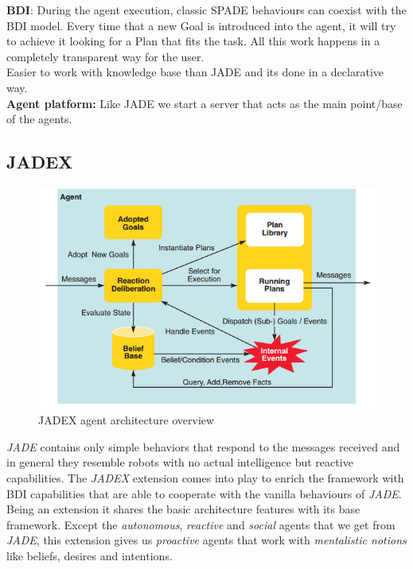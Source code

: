 \documentclass[a4paper, 11pt]{article}
\begin{document}
\noindent \textbf{BDI}: During the agent execution, classic SPADE behaviours can coexist with the BDI model. Every time that a new Goal is introduced into the agent, it will try to achieve it looking for a Plan that fits the task. All this work happens in a completely transparent way for the user. \\
Easier to work with knowledge base than JADE and its done in a declarative way. \\

\noindent \textbf{Agent platform:} Like JADE we start a server that acts as the main point/base of the agents.

\subsection{JADEX}

\begin{figure}[H]
	\caption{JADEX agent architecture overview}
	\centering
	\includegraphics[scale=0.6]{./images/jadex_overview.png}
\end{figure}

\textit{JADE} contains only simple behaviors that respond to the messages received and in general they resemble robots with no actual intelligence but reactive capabilities. The \textit{JADEX} extension comes into play to enrich the framework with BDI capabilities that are able to cooperate with the vanilla behaviours of \textit{JADE}. \\

Being an extension it shares the basic architecture features with its base framework. Except the \textit{autonomous}, \textit{reactive} and \textit{social} agents that we get from \textit{JADE}, this extension gives us \textit{proactive} agents that work with \textit{mentalistic notions} like beliefs, desires and intentions. \\
\end{document}

